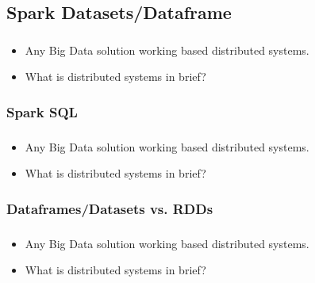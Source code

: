 \subsection{Spark Datasets/Dataframe}


\begin{frame}
  \frametitle{\subsecname}
	\begin{itemize} 
		\item Any Big Data solution working based distributed systems.
		\item What is distributed systems in brief?
	\end{itemize}
\end{frame}



\subsubsection{Spark SQL}
\begin{frame}
  \frametitle{\subsecname}
	\begin{itemize} 
		\item Any Big Data solution working based distributed systems.
		\item What is distributed systems in brief?
	\end{itemize}
\end{frame}


\subsubsection{Dataframes/Datasets vs. RDDs}

\begin{frame}
  \frametitle{\subsecname}
	\begin{itemize} 
		\item Any Big Data solution working based distributed systems.
		\item What is distributed systems in brief?
	\end{itemize}
\end{frame}

